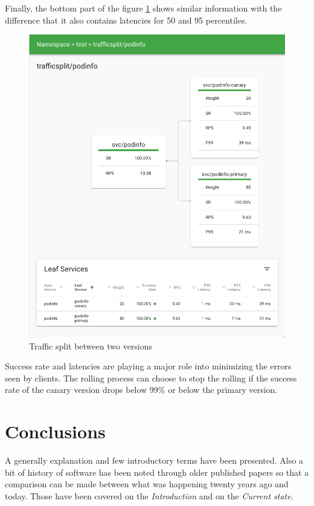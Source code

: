 \documentclass[conference]{IEEEtran}
\begin{document}
    Finally, the bottom part of the figure \ref{fig:canary} shows similar information with the difference that it also contains latencies for 50 and 95 percentiles.

    \begin{figure}
        \centering
        \includegraphics[scale=0.25]{canary.png}
        \caption{Traffic split between two versions}
        \label{fig:canary}
    \end{figure}

    Success rate and latencies are playing a major role into minimizing the errors seen by clients. The rolling process can choose to stop the rolling if the success rate of the canary version drops below 99\% or below the primary version.

\section{Conclusions}

    A generally explanation and few introductory terms have been presented. Also a bit of history of software has been noted through older published papers so that a comparison can be made between what was happening twenty years ago and today. Those have been covered on the \textit{Introduction} and on the \textit{Current state}.
    
\end{document}
